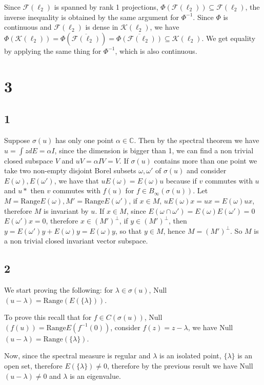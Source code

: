 \documentclass{article}
\begin{document}
Since $\mathcal{F}(\ell_2)$ is spanned by rank 1 projections, 
$\Phi(\mathcal{F}(\ell_2))\subseteq \mathcal{F}(\ell_2) $, the inverse
inequality is obtained by the same argument for $\Phi^{-1}$. 
Since $\Phi$ is continuous and $\mathcal{F}(\ell_2)$ is dense in $\mathcal{K}
(\ell_2)$, we have $\Phi(\mathcal{K}
(\ell_2))=\Phi(\overline{\mathcal{F}(\ell_2)})=\overline{\Phi(\mathcal{F}(\ell_2))}
\subseteq \mathcal{K}
(\ell_2)$. We get equality by applying the same thing for $\Phi^{-1}$, which
is also continuous. 




\section*{3}
\subsection*{1}
Suppose $\sigma(u)$ has only one point $\alpha\in \mathbb{C}$. Then by the spectral theorem we have 
$u=\int z dE=\alpha I$, since the dimension is bigger than 1, we can find
a non trivial closed subspace $V$ and $uV=\alpha I V=V$.
If $\sigma(u)$ contains more than one point we take two non-empty disjoint Borel subsets 
$\omega,\omega'$ of $\sigma(u)$ and consider $E(\omega),E(\omega')$, we have
that $uE(\omega)=E(\omega)u$ because if $v$ commutes with $u$ and $u*$
then $v$ commutes with $f(u)$ for $f\in B_{\infty}(\sigma(u))$. Let $M=\text
{Range} E(\omega), M'=\text
{Range} E(\omega')$, if $x\in M$, $uE(\omega)x=ux=E(\omega)ux$, therefore $M$
is invariant by $u$. If $x\in M$, since $E(\omega\cap\omega')=E(\omega)E(\omega')=0$
$E(\omega')x=0$, therefore $x\in (M')^\perp$, if $y\in (M')^\perp$, then
$y=E(\omega')y+E(\omega)y=E(\omega)y$, so that $y\in M$, hence $M=(M')^\perp$. 
So $M$ is a non trivial closed invariant vector subspace.

\subsection*{2}

We start proving the following: for $\lambda\in \sigma(u)$, Null$(u-\lambda)=
\text{Range}(E(\{\lambda\}))$. 

To prove this recall that for $f\in C(\sigma(u))$, Null$(f(u))=\text{Range}
E(f^{-1}(0))$, consider $f(z)=z-\lambda$, we have Null$(u-\lambda)=\text{Range}
(\{\lambda\})$. 

Now, since the spectral measure is regular and $\lambda$ is an isolated point, 
$\{\lambda\}$ is an open set, therefore $E(\{\lambda\})\neq 0$, therefore by
the previous result we have Null$(u-\lambda)\neq 0$ and $\lambda$ is an eigenvalue.
\end{document}

